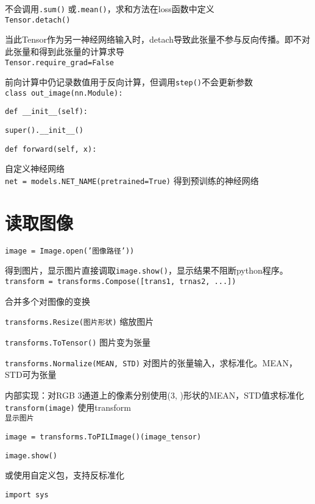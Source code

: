 \documentclass[UTF8]{ctexart}
\begin{document}
  不会调用\texttt{.sum()} 或\texttt{.mean()}，求和方法在loss函数中定义\\
\texttt{Tensor.detach()}

  当此Tensor作为另一神经网络输入时，detach导致此张量不参与反向传播。即不对此张量和得到此张量的计算求导\\
\texttt{Tensor.require\_grad=False}

  前向计算中仍记录数值用于反向计算，但调用\texttt{step()}不会更新参数\\
\texttt{class out\_image(nn.Module):}

  \texttt{def \_\_init\_\_(self):}

  \quad \texttt{super().\_\_init\_\_()}

  \texttt{def forward(self, x):}

  \quad 自定义神经网络\\
\texttt{net = models.NET\_NAME(pretrained=True)} 得到预训练的神经网络

\section{读取图像}
\noindent \texttt{image = Image.open('图像路径'))}

  得到图片，显示图片直接调取\texttt{image.show()}，显示结果不阻断python程序。\\
\texttt{transform = transforms.Compose([trans1, trnas2, ...])}

  合并多个对图像的变换

  \texttt{transforms.Resize(图片形状)} 缩放图片

  \texttt{transforms.ToTensor()} 图片变为张量

  \texttt{transforms.Normalize(MEAN, STD)} 对图片的张量输入，求标准化。MEAN，STD可为张量
  
  \quad 内部实现：对RGB 3通道上的像素分别使用(3, )形状的MEAN，STD值求标准化\\
\texttt{transform(image)} 使用transform\\
\texttt{显示图片}

  \texttt{image = transforms.ToPILImage()(image\_tensor)}

  \texttt{image.show()}
  
  或使用自定义包，支持反标准化

  \texttt{import sys}
\end{document}
